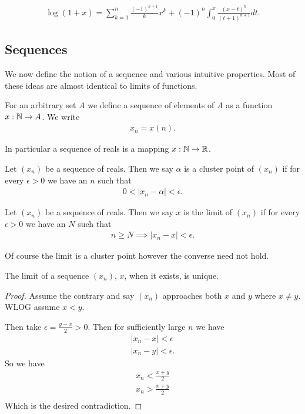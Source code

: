 \documentclass[]{article}
\begin{document}
\begin{align*}
	\log(1+x) = \sum_{k=1}^n \frac{(-1)^{k+1}}{k} x^k + (-1)^n \int_0^x \frac{(x-t)^n}{(t+1)^{n+1}} dt.
\end{align*}

\subsection{Sequences}

We now define the notion of a sequence and various intuitive properties. Most of these ideas are almost identical to limits of functions.

\begin{defi} [Sequence]
	For an arbitrary set $A$ we define a sequence of elements of $A$ as a function $x: \mathbb{N} \to A$. We write 
	\begin{align*}
			x_n = x(n).	
	\end{align*}

	In particular a sequence of reals is a mapping $x: \mathbb{N} \to \mathbb{R}$.
\end{defi}

\begin{defi} 
		Let $(x_n)$ be a sequence of reals. Then we say $\alpha$ is a cluster point of $(x_n)$ if for every $\epsilon > 0$ we have an $n$ such that
		\begin{align*}
				0 < |x_n - \alpha| < \epsilon.
		\end{align*}
\end{defi}

\begin{defi} [Limit]
		Let $(x_n)$ be a sequence of reals. Then we say $x$ is the limit of $(x_n)$ if for every $\epsilon > 0$ we have an $N$ such that
		\begin{align*}
				n \geq N \implies |x_n - x| < \epsilon.
		\end{align*}
\end{defi}

Of course the limit is a cluster point however the converse need not hold.

\begin{thm} 
		The limit of a sequence $(x_n)$, $x$, when it exists, is unique.	
\end{thm}

\begin{proof}
		Assume the contrary and say $(x_n)$ approaches both $x$ and $y$ where $x \neq y$. WLOG assume $x < y$.

		Then take $\epsilon = \frac{y-x}{2} > 0$. Then for sufficiently large $n$ we have
		\begin{align*}
			|x_n - x| < \epsilon \\
			|x_n - y| < \epsilon.
		\end{align*}
		So we have
		\begin{align*}
			x_n < \frac{x+y}{2} \\	
			x_n > \frac{x+y}{2} \\	
		\end{align*}
		Which is the desired contradiction.
\end{proof}
\end{document}
